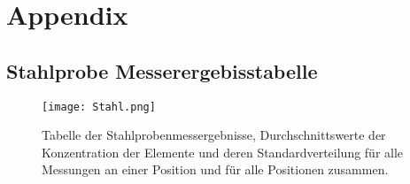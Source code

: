 \section{Appendix}
\subsection{Stahlprobe Messerergebisstabelle}
\begin{figure}[h]
 \centering
 \texttt{[image: Stahl.png]}
 \caption[Stahl Tabelle]{Tabelle der Stahlprobenmessergebnisse, Durchschnittswerte der Konzentration der Elemente und deren Standardverteilung für alle Messungen an einer Position und für alle Positionen zusammen. }
 \label{fig:Stahl}
\end{figure}
